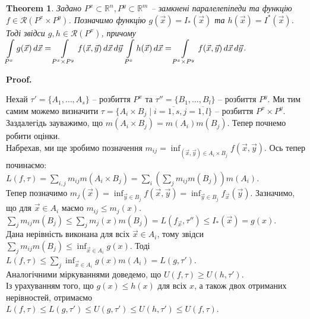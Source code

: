 \documentclass[a4paper, 10pt]{article}
\makeatletter
\def\qed{$\blacksquare$}
\theoremstyle{theoremdd}
\newtheorem{theorem}{Theorem}[subsection]
\theoremstyle{theoremdd}
\theoremstyle{theoremdd}
\theoremstyle{theoremdd}
\theoremstyle{theoremdd}
\theoremstyle{theoremdd}
\theoremstyle{theoremdd}
\theoremstyle{theoremdd}
\theoremstyle{theoremdd}
\theoremstyle{theoremdd}
\theoremstyle{theoremdd}
\theoremstyle{theoremdd}
\theoremstyle{theoremdd}
\theoremstyle{theoremdd}
\theoremstyle{theoremdd}
\renewenvironment{proof}[1][Proof.\\]{\par
\pushQED{\hfill \qed}%
\normalfont \topsep6\p@\@plus6\p@\relax
\trivlist
\item\relax
{\bfseries
#1\@addpunct{.}}\hspace\labelsep\ignorespaces
}{%
\popQED\endtrivlist\@endpefalse
}
\makeatother
\begin{document}
\begin{theorem}
Задано $P^x \subset \mathbb{R}^n, P^y \subset \mathbb{R}^m$ -- замкнені паралелепіпеди та функцію $f \in \mathcal{R}(P^x \times P^y)$. Позначимо функцію $g(\vec{x}) = I_*(\vec{x})$ та $h(\vec{x}) = I^*(\vec{x})$. Тоді звідси $g,h \in \mathcal{R}(P^x)$, причому\\
$\displaystyle\int\displaylimits_{P^x} g(\vec{x})\,d\vec{x} = \int\displaylimits_{P^x \times P^y} f(\vec{x},\vec{y})\,d\vec{x}\,d\vec{y}$ \qquad $\displaystyle\int\displaylimits_{P^x} h(\vec{x})\,d\vec{x} = \int\displaylimits_{P^x \times P^y} f(\vec{x},\vec{y})\,d\vec{x}\,d\vec{y}$.
\end{theorem}

\begin{proof}
Нехай $\tau' = \{A_1,\dots,A_s\}$ -- розбиття $P^x$ та $\tau'' = \{B_1,\dots,B_l\}$ -- розбиття $P^y$. Ми тим самим можемо визначити $\tau = \{A_i \times B_j \mid i = \overline{1,s}, j = \overline{1,l}\}$ -- розбиття $P^x \times P^y$.\\
Заздалегідь зауважимо, що $m(A_i \times B_j) = m(A_i) m(B_j)$. Тепер почнемо робити оцінки.\\
Набрехав, ми ще зробимо позначення $m_{ij} = \displaystyle\inf_{(\vec{x},\vec{y}) \in A_i \times B_j} f(\vec{x},\vec{y})$. Ось тепер починаємо:\\
$L(f,\tau) = \displaystyle\sum_{i,j} m_{ij} m(A_i \times B_j) = \sum_i \left( \sum_j m_{ij} m(B_j) \right) m(A_i)$.\\
Тепер позначимо $m_j(\vec{x}) = \displaystyle\inf_{\vec{y} \in B_j} f(\vec{x},\vec{y}) = \inf_{\vec{y} \in B_j} f_{\vec{x}}(\vec{y})$. Зазначимо, що для $\vec{x} \in A_i$ маємо $m_{ij} \leq m_j(x)$.\\
$\displaystyle\sum_j m_{ij} m(B_j) \leq \sum_j m_j(x) m(B_j) = L(f_{\vec{x}},\tau'') \leq I_*(\vec{x}) = g(x)$.\\
Дана нерівність виконана для всіх $\vec{x} \in A_i$, тому звідси $\displaystyle\sum_j m_{ij} m(B_j) \leq \inf_{\vec{x} \in A_i} g(x)$. Тоді\\
$L(f,\tau) \leq \displaystyle\sum_j \inf_{\vec{x} \in A_i} g(x) m(A_i) = L(g,\tau')$.\\
Аналогічними міркуваннями доведемо, що $U(f,\tau) \geq U(h,\tau')$.\\
Із урахуванням того, що $g(x) \leq h(x)$ для всіх $x$, а також двох отриманих нерівностей, отримаємо\\
$L(f,\tau) \leq L(g,\tau') \leq U(g,\tau') \leq U(h,\tau') \leq U(f,\tau)$.\\

\end{proof}
\end{document}
